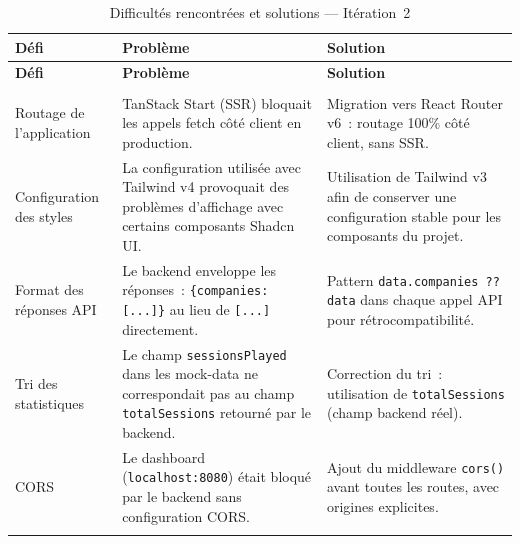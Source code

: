 {
\small
\setlength{\tabcolsep}{4pt}

\begin{longtable}{
    >{\raggedright\arraybackslash}p{3cm}
    >{\raggedright\arraybackslash}p{5.4cm}
    >{\raggedright\arraybackslash}p{5.4cm}
}

\toprule
\textbf{Défi} & \textbf{Problème} & \textbf{Solution} \\
\midrule
\endfirsthead

\toprule
\textbf{Défi} & \textbf{Problème} & \textbf{Solution} \\
\midrule
\endhead

\midrule
\multicolumn{3}{r}{\small\textit{Suite à la page suivante}} \\
\endfoot

\endlastfoot


Routage de l'application &
TanStack Start (SSR) bloquait les appels
fetch côté client en production. &
Migration vers React Router v6~: routage
100\% côté client, sans SSR.
\\

\midrule

Configuration des styles &
La configuration utilisée avec Tailwind v4 provoquait des problèmes
d'affichage avec certains composants Shadcn UI. &
Utilisation de Tailwind v3 afin de conserver une configuration
stable pour les composants du projet.
\\

\midrule

Format des réponses API &
Le backend enveloppe les réponses~:
\texttt{\{companies: [...]\}} au lieu de
\texttt{[...]} directement. &
Pattern \texttt{data.companies ?? data}
dans chaque appel API pour
rétrocompatibilité.
\\

\midrule

Tri des statistiques &
Le champ \texttt{sessionsPlayed} dans les
mock-data ne correspondait pas au champ
\texttt{totalSessions} retourné par le backend. &
Correction du tri~: utilisation de
\texttt{totalSessions} (champ backend réel).
\\

\midrule

CORS &
Le dashboard (\texttt{localhost:8080}) était bloqué
par le backend sans configuration CORS. &
Ajout du middleware \texttt{cors()} avant toutes les
routes, avec origines explicites.
\\

\bottomrule

\caption{Difficultés rencontrées et solutions --- Itération~2}
\label{tab:dificultes_s2}\\

\end{longtable}
}

